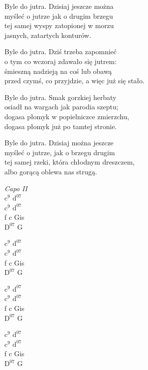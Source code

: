 \begin{text}
    \hfill\break
    Byle do jutra. Dzisiaj jeszcze można\\
    myśleć o jutrze jak o drugim brzegu\\
    tej samej wyspy zatopionej w morzu\\
    jasnych, zatartych konturów.

    Byle do jutra. Dziś trzeba zapomnieć\\
    o tym co wczoraj zdawało się jutrem:\\
    śmieszną nadzieją na coś lub obawą\\
    przed czymś, co przyjdzie, a więc już się stało.

    Byle do jutra. Smak gorzkiej herbaty\\
    osiadł na wargach jak parodia szeptu;\\
    dogasa płomyk w popielniczce zmierzchu,\\
    dogasa płomyk już po tamtej stronie.

    Byle do jutra. Dzisiaj można jeszcze\\
    myśleć o jutrze, jak o brzegu drugim\\
    tej samej rzeki, która chłodnym dreszczem,\\
    albo gorącą oblewa nas strugą.
\end{text}
\begin{chord}
    \textit{Capo II}\\
    $\mathrm{c^9}$ $\mathrm{d^{07}}$\\
    $\mathrm{c^9}$ $\mathrm{d^{07}}$\\
    f c Gis\\
    $\mathrm{D^{07}}$ G

    $\mathrm{c^9}$ $\mathrm{d^{07}}$\\
    $\mathrm{c^9}$ $\mathrm{d^{07}}$\\
    f c Gis\\
    $\mathrm{D^{07}}$ G

    $\mathrm{c^9}$ $\mathrm{d^{07}}$\\
    $\mathrm{c^9}$ $\mathrm{d^{07}}$\\
    f c Gis\\
    $\mathrm{D^{07}}$ G

    $\mathrm{c^9}$ $\mathrm{d^{07}}$\\
    $\mathrm{c^9}$ $\mathrm{d^{07}}$\\
    f c Gis\\
    $\mathrm{D^{07}}$ G
\end{chord}
